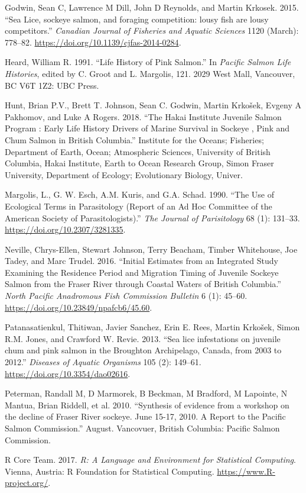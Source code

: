 \documentclass[fleqn,10pt]{wlpeerj} %
\begin{document}
\leavevmode\hypertarget{ref-Godwin2015}{}%
Godwin, Sean C, Lawrence M Dill, John D Reynolds, and Martin Krkosek. 2015. ``Sea Lice, sockeye salmon, and foraging competition: lousy fish are lousy competitors.'' \emph{Canadian Journal of Fisheries and Aquatic Sciences} 1120 (March): 778--82. \url{https://doi.org/10.1139/cjfas-2014-0284}.

\leavevmode\hypertarget{ref-Heard1991}{}%
Heard, William R. 1991. ``Life History of Pink Salmon.'' In \emph{Pacific Salmon Life Histories}, edited by C. Groot and L. Margolis, 121. 2029 West Mall, Vancouver, BC V6T 1Z2: UBC Press.

\leavevmode\hypertarget{ref-Hunt2018}{}%
Hunt, Brian P.V., Brett T. Johnson, Sean C. Godwin, Martin Krkošek, Evgeny A Pakhomov, and Luke A Rogers. 2018. ``The Hakai Institute Juvenile Salmon Program : Early Life History Drivers of Marine Survival in Sockeye , Pink and Chum Salmon in British Columbia.'' Institute for the Oceans; Fisheries; Department of Earth, Ocean; Atmospheric Sciences, University of British Columbia, Hakai Institute, Earth to Ocean Research Group, Simon Fraser University, Department of Ecology; Evolutionary Biology, Univer.

\leavevmode\hypertarget{ref-Margolis1990}{}%
Margolis, L., G. W. Esch, A.M. Kuris, and G.A. Schad. 1990. ``The Use of Ecological Terms in Parasitology (Report of an Ad Hoc Committee of the American Society of Parasitologists).'' \emph{The Journal of Parisitology} 68 (1): 131--33. \url{https://doi.org/10.2307/3281335}.

\leavevmode\hypertarget{ref-Neville2016}{}%
Neville, Chrys-Ellen, Stewart Johnson, Terry Beacham, Timber Whitehouse, Joe Tadey, and Marc Trudel. 2016. ``Initial Estimates from an Integrated Study Examining the Residence Period and Migration Timing of Juvenile Sockeye Salmon from the Fraser River through Coastal Waters of British Columbia.'' \emph{North Pacific Anadromous Fish Commission Bulletin} 6 (1): 45--60. \url{https://doi.org/10.23849/npafcb6/45.60}.

\leavevmode\hypertarget{ref-Patanasatienkul2013}{}%
Patanasatienkul, Thitiwan, Javier Sanchez, Erin E. Rees, Martin Krkošek, Simon R.M. Jones, and Crawford W. Revie. 2013. ``Sea lice infestations on juvenile chum and pink salmon in the Broughton Archipelago, Canada, from 2003 to 2012.'' \emph{Diseases of Aquatic Organisms} 105 (2): 149--61. \url{https://doi.org/10.3354/dao02616}.

\leavevmode\hypertarget{ref-Peterman2010}{}%
Peterman, Randall M, D Marmorek, B Beckman, M Bradford, M Lapointe, N Mantua, Brian Riddell, et al. 2010. ``Synthesis of evidence from a workshop on the decline of Fraser River sockeye. June 15-17, 2010. A Report to the Pacific Salmon Commission.'' August. Vancovuer, British Columbia: Pacific Salmon Commission.

\leavevmode\hypertarget{ref-R}{}%
R Core Team. 2017. \emph{R: A Language and Environment for Statistical Computing}. Vienna, Austria: R Foundation for Statistical Computing. \url{https://www.R-project.org/}.
\end{document}
